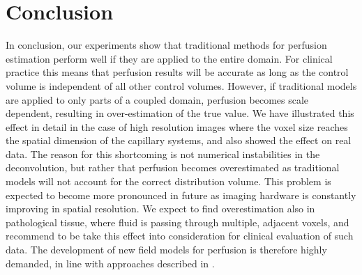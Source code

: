 \documentclass[journal,twocolumn]{IEEEtran}
\begin{document}
	\section{Conclusion}
	In conclusion, our experiments show that traditional methods for perfusion estimation perform well if they are applied to the entire domain.
	For clinical practice this means that perfusion results will be accurate as long as the control volume is independent of all other control volumes.	
	However, if traditional models are applied to only parts of a coupled domain, perfusion becomes scale dependent, resulting in over-estimation of the true value.
	We have illustrated this effect in detail in the case of high resolution images where the voxel size reaches the spatial dimension of the capillary systems, and also showed the effect on real data.
		The reason for this shortcoming is not numerical instabilities in the deconvolution, but rather that perfusion becomes overestimated as traditional models will not account for the correct distribution volume.
  	This problem is expected to become more pronounced in future as imaging hardware is constantly improving in spatial resolution.
	We expect to find overestimation also in pathological tissue, where fluid is passing through multiple, adjacent voxels, and recommend to be take this effect into consideration for clinical evaluation of such data. The development of new field models for perfusion is therefore highly demanded, in line with approaches described in \cite{sourbron14,Michler2013}. 	

	
		
	
\end{document}
